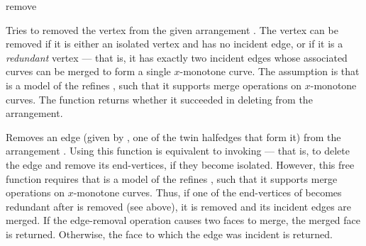 
\begin{ccRefFunction}{remove}


   {Tries to removed the vertex  from the given arrangement .
    The vertex can be removed if it is either an isolated vertex and has no
    incident edge, or if it is a {\sl redundant} vertex --- that is, it has
    exactly two incident edges whose associated curves can be merged to form
    a single $x$-monotone curve. The assumption is that  is a
    model of the refines , such that it
    supports merge operations on $x$-monotone curves.
    The function returns whether it succeeded in deleting  from the
    arrangement.}

   {Removes an edge (given by , one of the twin halfedges that form it)
    from the arrangement . Using this function is equivalent to
    invoking  --- that is, to delete the
    edge and remove its end-vertices, if they become isolated. However, this
    free function requires that  is a model of the refines
    , such that it supports merge operations
    on $x$-monotone curves. Thus, if one of the end-vertices of  becomes
    redundant after  is removed (see above), it is removed and its
    incident edges are merged.
    If the edge-removal operation causes two faces to merge, the merged face
    is returned. Otherwise, the face to which the edge was incident is
    returned.}

\end{ccRefFunction}
